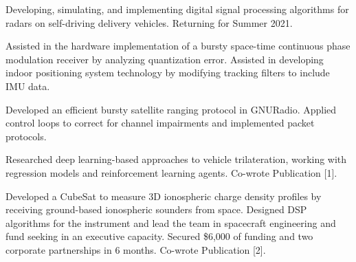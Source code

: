 \documentclass[10pt,a4paper,ragged2e,withhyper]{altacv}
\begin{document}
\begin{paracol}{2}

Developing, simulating, and implementing digital signal processing algorithms for radars on self-driving delivery vehicles. Returning for Summer 2021.

\divider

Assisted in the hardware implementation of a bursty space-time continuous phase modulation receiver by analyzing quantization error. Assisted in developing indoor positioning system technology by modifying tracking filters to include IMU data.

\divider

Developed an efficient bursty satellite ranging protocol in GNURadio. Applied control loops to correct for channel impairments and implemented packet protocols.

\divider

Researched deep learning-based approaches to vehicle trilateration, working with regression models and reinforcement learning agents. Co-wrote Publication [1].

\divider

Developed a CubeSat to measure 3D ionospheric charge density profiles by receiving ground-based ionospheric sounders from space. Designed DSP algorithms for the instrument and lead the team in spacecraft engineering and fund seeking in an executive capacity. Secured \$6,000 of funding and two corporate partnerships in 6 months. Co-wrote Publication [2].


\end{paracol}
\end{document}
